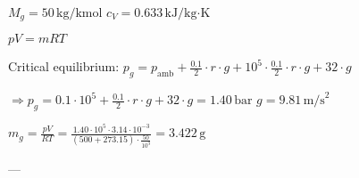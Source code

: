\( M_g = 50 \, \text{kg/kmol} \)  
\( c_V = 0.633 \, \text{kJ/kg·K} \)  

\( pV = mRT \)  

Critical equilibrium:  
\( p_g = p_{\text{amb}} + \frac{0.1}{2} \cdot r \cdot g + 10^5 \cdot \frac{0.1}{2} \cdot r \cdot g + 32 \cdot g \)  

\( \Rightarrow p_g = 0.1 \cdot 10^5 + \frac{0.1}{2} \cdot r \cdot g + 32 \cdot g = 1.40 \, \text{bar} \)  
\( g = 9.81 \, \text{m/s}^2 \)  

\( m_g = \frac{pV}{RT} = \frac{1.40 \cdot 10^5 \cdot 3.14 \cdot 10^{-3}}{(500 + 273.15) \cdot \frac{50}{10^3}} = 3.422 \, \text{g} \)  

---
